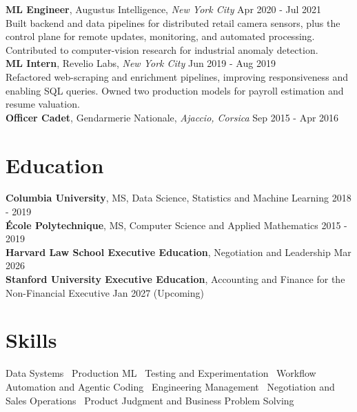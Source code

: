 \documentclass[a4paper,9pt]{article}
\newcommand{\role}[4]{%
  \textbf{#1}, #2, \textit{#3} \hfill #4\\[-0.5mm]
}
\begin{document}
\role{ML Engineer}{Augustus Intelligence}{New York City}{Apr 2020 - Jul 2021}
Built backend and data pipelines for distributed retail camera sensors, plus the control plane for remote updates, monitoring, and automated processing. Contributed to computer-vision research for industrial anomaly detection.\\[1mm]

\role{ML Intern}{Revelio Labs}{New York City}{Jun 2019 - Aug 2019}
Refactored web-scraping and enrichment pipelines, improving responsiveness and enabling SQL queries. Owned two production models for payroll estimation and resume valuation.\\[1mm]

\role{Officer Cadet}{Gendarmerie Nationale}{Ajaccio, Corsica}{Sep 2015 - Apr 2016}

\section*{Education}
\textbf{Columbia University}, MS, Data Science, Statistics and Machine Learning \hfill 2018 - 2019\\
\textbf{École Polytechnique}, MS, Computer Science and Applied Mathematics \hfill 2015 - 2019\\
\textbf{Harvard Law School Executive Education}, Negotiation and Leadership \hfill Mar 2026\\
\textbf{Stanford University Executive Education}, Accounting and Finance for the Non-Financial Executive \hfill Jan 2027 (Upcoming)

\section*{Skills}
Data Systems \textbar\ Production ML \textbar\ Testing and Experimentation \textbar\ Workflow Automation and Agentic Coding \textbar\ Engineering Management \textbar\ Negotiation and Sales Operations \textbar\ Product Judgment and Business Problem Solving
\end{document}
